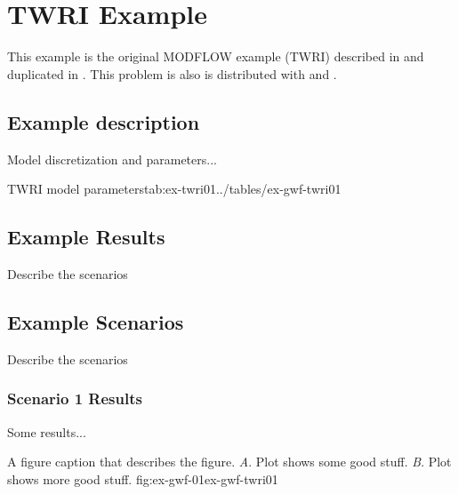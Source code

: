 \section{\mf TWRI Example}

This example is the original MODFLOW example (TWRI) described in \cite{modflow88} and duplicated in \cite{harbaugh1996user}. This problem is also is distributed with \mff \citep{modflow2005} and \mf \citep{modflow6software}.

\subsection{Example description}

Model discretization and parameters...





\begin{StandardTable}{TWRI model parameters}{tab:ex-twri01}{../tables/ex-gwf-twri01}
\end{StandardTable}

\subsection{Example Results}

Describe the scenarios

\subsection{Example Scenarios}

Describe the scenarios


\subsubsection{Scenario 1 Results}

Some results...

\begin{StandardFigure}{
                                     A figure caption that describes the figure. 
                                     \textit{A}. Plot shows some good stuff.
                                     \textit{B}. Plot shows more good stuff.
                                     }{fig:ex-gwf-01}{ex-gwf-twri01}
\end{StandardFigure}                                 


